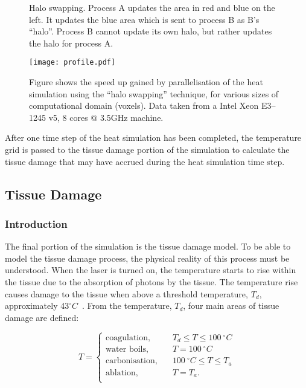 
\begin{figure}[!htbp]
\centering
\def\svgwidth{250pt}

\caption{Halo swapping. Process A updates the area in red and blue on the left. It updates the blue area which is sent to process B as B's ``halo''. Process B cannot update its own halo, but rather updates the halo for process A.}
\label{fig:haloswap}
\end{figure}

\begin{figure}[!htbp]
\centering
\texttt{[image: profile.pdf]}
\caption{Figure shows the speed up gained by parallelisation of the heat simulation using the ``halo swapping'' technique, for various sizes of computational domain (voxels). Data taken from a Intel Xeon E3--1245 v5, 8 cores @ 3.5GHz machine.}
\label{fig:parallel}
\end{figure}

After one time step of the heat simulation has been completed, the temperature grid is passed to the tissue damage portion of the simulation to calculate the tissue damage that may have accrued during the heat simulation time step.
\FloatBarrier

\subsection{Tissue Damage}
\label{sec:tissuedamage}

\subsubsection*{Introduction}
The final portion of the simulation is the tissue damage model.
To be able to model the tissue damage process, the physical reality of this process must be understood.
When the laser is turned on, the temperature starts to rise within the tissue due to the absorption of photons by the tissue. The temperature rise causes damage to the tissue when above a threshold temperature, $T_d$, approximately 43$^{\circ}C$~\cite{welch2011optical}.
From the temperature, $T_d$, four main areas of tissue damage are defined:


\begin{equation}
T = 
     \begin{cases}
       \text{coagulation,} &\quad T_d\leq T \leq 100~^{\circ}C\\
       \text{water boils,} &\quad T=100~^{\circ}C\\
       \text{carbonisation,} &\quad 100~^{\circ}C \leq T \leq T_a\\
       \text{ablation,} &\quad T=T_a.\\
     \end{cases}
\end{equation}


